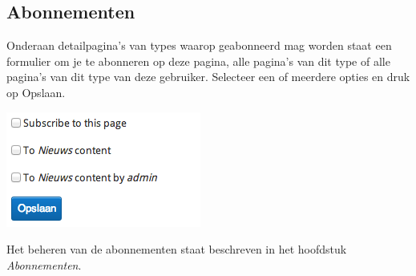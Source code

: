 \subsection{Abonnementen}\label{abonnementen}
Onderaan detailpagina's van types waarop geabonneerd mag worden staat een formulier om je te abonneren op deze pagina, alle pagina's van dit type of alle pagina's van dit type van deze gebruiker. Selecteer een of meerdere opties en druk op Opslaan.

\begin{center}
	\includegraphics[scale=0.75]{img/abonnementen.png}
\end{center}

Het beheren van de abonnementen staat beschreven in het hoofdstuk \emph{Abonnementen}.